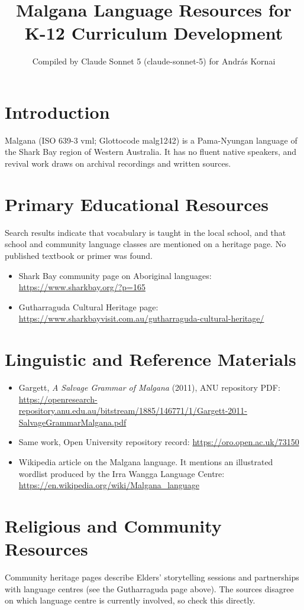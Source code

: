 \documentclass[12pt]{article}
\title{Malgana Language Resources for K-12 Curriculum Development}
\author{Compiled by Claude Sonnet 5 (claude-sonnet-5) for Andr\'as Kornai}
\date{}
\begin{document}
\maketitle

\section{Introduction}
Malgana (ISO 639-3 vml; Glottocode malg1242) is a Pama-Nyungan language of the Shark Bay region of Western Australia. It has no fluent native speakers, and revival work draws on archival recordings and written sources.

\section{Primary Educational Resources}
Search results indicate that vocabulary is taught in the local school, and that school and community language classes are mentioned on a heritage page. No published textbook or primer was found.
\begin{itemize}
\item Shark Bay community page on Aboriginal languages: \url{https://www.sharkbay.org/?p=165}
\item Gutharraguda Cultural Heritage page: \url{https://www.sharkbayvisit.com.au/gutharraguda-cultural-heritage/}
\end{itemize}

\section{Linguistic and Reference Materials}
\begin{itemize}
\item Gargett, \emph{A Salvage Grammar of Malgana} (2011), ANU repository PDF: \url{https://openresearch-repository.anu.edu.au/bitstream/1885/146771/1/Gargett-2011-SalvageGrammarMalgana.pdf}
\item Same work, Open University repository record: \url{https://oro.open.ac.uk/73150}
\item Wikipedia article on the Malgana language. It mentions an illustrated wordlist produced by the Irra Wangga Language Centre: \url{https://en.wikipedia.org/wiki/Malgana_language}
\end{itemize}

\section{Religious and Community Resources}
Community heritage pages describe Elders' storytelling sessions and partnerships with language centres (see the Gutharraguda page above). The sources disagree on which language centre is currently involved, so check this directly.
\end{document}
